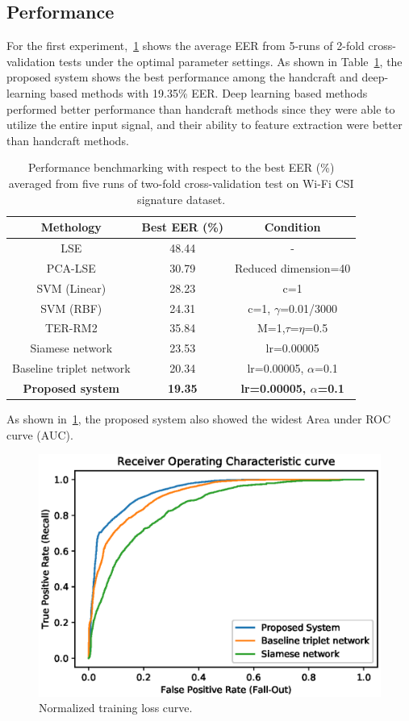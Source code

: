 \subsection{Performance}
For the first experiment,~\ref{tab_performance} shows the average EER from 5-runs of 2-fold cross-validation tests under the optimal parameter settings. As shown in Table~\ref{tab_performance}, the proposed system shows the best performance among the handcraft and deep-learning based methods with 19.35\% EER.
Deep learning based methods performed better performance than handcraft methods since they were able to utilize the entire input signal, and their ability to feature extraction were better than handcraft methods.
\begin{table}[!h]
    \caption{Performance benchmarking with respect to the best EER (\%) averaged from five runs of two-fold cross-validation test on Wi-Fi CSI signature dataset.}\label{tab_performance}
    \centering
    \begin{tabular}{|c|c|c|}
    \hline
    Methology   &   Best EER (\%) &   Condition   \\  \hline
    LSE &   48.44   &  - \\ 
    PCA-LSE    &   30.79   &  Reduced dimension=40    \\
    SVM (Linear) &   28.23   &   c=1 \\
    SVM (RBF)    &   24.31   &   c=1, $\gamma$=0.01/3000 \\
    TER-RM2 &   35.84   &  M=1,$\tau$=$\eta$=0.5   \\     \hline
    Siamese network  &   23.53   &   lr=0.00005  \\
    Baseline triplet network &   20.34   &   lr=0.00005, $\alpha$=0.1  \\
    \textbf{Proposed system} &   \textbf{19.35}   &  \textbf{lr=0.00005, $\alpha$=0.1}  \\
     \hline
    \end{tabular}
\end{table}

As shown in~\ref{fig_roc}, the proposed system also showed the widest Area under ROC curve (AUC).
\begin{figure}[!ht]
    \includegraphics[width=\textwidth]{fig_roc_v15.eps}
    \caption{Normalized training loss curve.} \label{fig_roc}
\end{figure}
